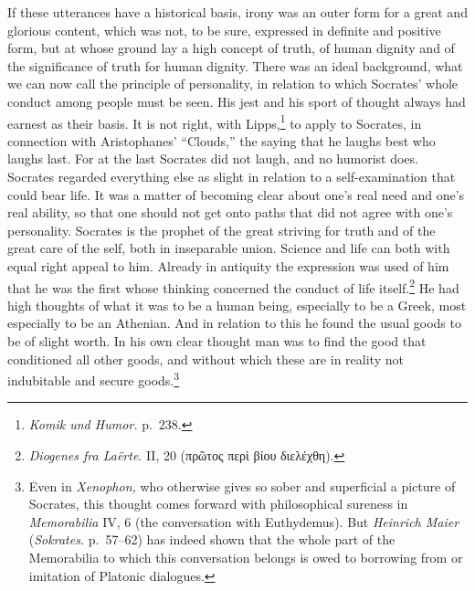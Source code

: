 \documentclass[12pt]{book}
\begin{document}
If these utterances have a historical basis, irony was an outer form for a great and glorious
content, which was not, to be sure, expressed in definite and positive form, but at whose ground
lay a high concept of truth, of human dignity and of the significance of truth for human dignity.
There was an ideal background, what we can now call the principle of personality, in relation to
which Socrates' whole conduct among people must be seen. His jest and his sport of thought always
had earnest as their basis. It is not right, with Lipps,\footnote{\textit{Komik und Humor.}
p.~238.} to apply to Socrates, in connection with Aristophanes' ``Clouds,'' the saying that he
laughs best who laughs last. For at the last Socrates did not laugh, and no humorist does.
Socrates regarded everything else as slight in relation to a self-examination that could bear
life. It was a matter of becoming clear about one's real need and one's real ability, so that
one should not get onto paths that did not agree with one's personality. Socrates is the prophet
of the great striving for truth and of the great care of the self, both in inseparable union.
Science and life can both with equal right appeal to him. Already in antiquity the expression
was used of him that he was the first whose thinking concerned the conduct of life
itself.\footnote{\textit{Diogenes fra Laërte}. II, 20 (πρῶτος περὶ βίου διελέχθη).} He had high
thoughts of what it was to be a human being, especially to be a Greek, most especially to be an
Athenian. And in relation to this he found the usual goods to be of slight worth. In his own clear
thought man was to find the good that conditioned all other goods, and without which these are
in reality not indubitable and secure goods.\footnote{Even in \textit{Xenophon,} who otherwise
gives so sober and superficial a picture of Socrates, this thought comes forward with
philosophical sureness in \textit{Memorabilia} IV, 6 (the conversation with Euthydemus). But
\textit{Heinrich Maier} (\textit{Sokrates.} p.~57--62) has indeed shown that the whole part of
the Memorabilia to which this conversation belongs is owed to borrowing from or imitation of
Platonic dialogues.}
\end{document}
